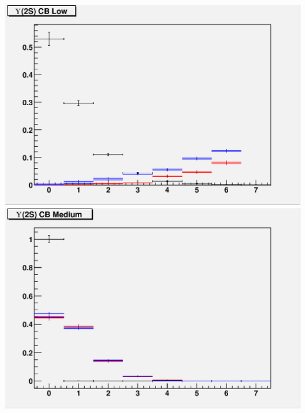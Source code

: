 \documentclass[12pt]{article}
\begin{document}
\includegraphics[width=\linewidth]{trigger2_cblo.eps}
\vfill
\includegraphics[width=\linewidth]{trigger2_cbmd.eps}
\end{document}
